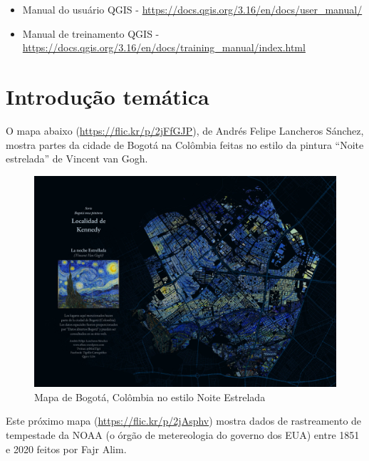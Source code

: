 \documentclass[
]{book}
\providecommand{\tightlist}{%
  \setlength{\itemsep}{0pt}\setlength{\parskip}{0pt}}
\begin{document}
\begin{itemize}
\tightlist
\item
  Manual do usuário QGIS - \url{https://docs.qgis.org/3.16/en/docs/user_manual/}
\item
  Manual de treinamento QGIS - \url{https://docs.qgis.org/3.16/en/docs/training_manual/index.html}
\end{itemize}

\hypertarget{introduuxe7uxe3o-temuxe1tica-1}{%
\section{Introdução temática}\label{introduuxe7uxe3o-temuxe1tica-1}}

O mapa abaixo (\url{https://flic.kr/p/2jFfGJP}), de Andrés Felipe Lancheros Sánchez, mostra partes da cidade de Bogotá na Colômbia feitas no estilo da pintura ``Noite estrelada'' de Vincent van Gogh.

\begin{figure}
\centering
\includegraphics{media/modulo1/sample-1.jpg}
\caption{Mapa de Bogotá, Colômbia no estilo Noite Estrelada}
\end{figure}

Este próximo mapa (\url{https://flic.kr/p/2jAsphv}) mostra dados de rastreamento de tempestade da NOAA (o órgão de metereologia do governo dos EUA) entre 1851 e 2020 feitos por Fajr Alim.
\end{document}
